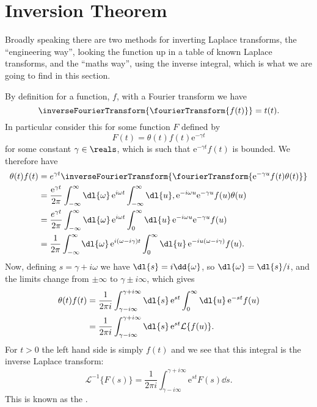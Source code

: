 \documentclass[fleqn]{NotesClass}
\newcommand*{\e}{\mathrm{e}}
\newcommand*{\laplaceTransform}{\mathcal{L}}
\newcommand*{\inverseLaplaceTransform}{\laplaceTransform^{-1}}
\begin{document}
    \section{Inversion Theorem}
    Broadly speaking there are two methods for inverting Laplace transforms, the \enquote{engineering way}, looking the function up in a table of known Laplace transforms, and the \enquote{maths way}, using the inverse integral, which is what we are going to find in this section.
    
    By definition for a function, \(f\), with a Fourier transform we have
    \begin{equation}
        \inverseFourierTransform\{ \fourierTransform\{ f(t) \} \} = t(t).
    \end{equation}
    In particular consider this for some function \(F\) defined by
    \begin{equation}
        F(t) = \theta(t) f(t) \e^{-\gamma t}
    \end{equation}
    for some constant \(\gamma \in \reals\), which is such that \(\e^{-\gamma t}f(t)\) is bounded.
    We therefore have
    \begin{align}
        \theta(t)f(t) &= e^{\gamma t}\inverseFourierTransform\{ \fourierTransform\{ \e^{-\gamma u}f(t)\theta(t) \} \}\\
        &= \frac{\e^{\gamma t}}{2\pi} \int_{-\infty}^{\infty} \dl{\omega} \, \e^{i\omega t} \int_{-\infty}^{\infty} \dl{u} , \e^{-i\omega u} \e^{-\gamma u} f(u) \theta(u)\\
        &= \frac{e^{\gamma t}}{2\pi} \int_{-\infty}^{\infty} \dl{\omega} \, \e^{i\omega t} \int_{0}^{\infty} \dl{u} \, \e^{-i\omega u}\e^{-\gamma u} f(u)\\
        &= \frac{1}{2\pi} \int_{-\infty}^{\infty} \dl{\omega} \, \e^{i(\omega - i\gamma)t} \int_{0}^{\infty} \dl{u} \, \e^{-iu(\omega - i\gamma)} f(u).
    \end{align}
    Now, defining \(s = \gamma + i\omega\) we have \(\dl{s} = i\dd{\omega}\), so \(\dl{\omega} = \dl{s}/i\), and the limits change from \(\pm \infty\) to \(\gamma \pm i\infty\), which gives
    \begin{align}
        \theta(t)f(t) &= \frac{1}{2\pi i} \int_{\gamma - i\infty}^{\gamma + i\infty} \dl{s} \, \e^{st} \int_{0}^{\infty} \dl{u} \, \e^{-st}f(u)\\
        &= \frac{1}{2\pi i} \int_{\gamma - i\infty}^{\gamma + i\infty} \dl{s} \, \e^{st} \laplaceTransform\{ f(u) \}.
    \end{align}
    For \(t > 0\) the left hand side is simply \(f(t)\) and we see that this integral is the inverse Laplace transform:
    \begin{equation}
        \inverseLaplaceTransform\{ F(s) \} = \frac{1}{2\pi i}\int_{\gamma - i\infty}^{\gamma + i\infty} \e^{st} F(s) \dd{s}.
    \end{equation}
    This is known as the .
    
\end{document}
